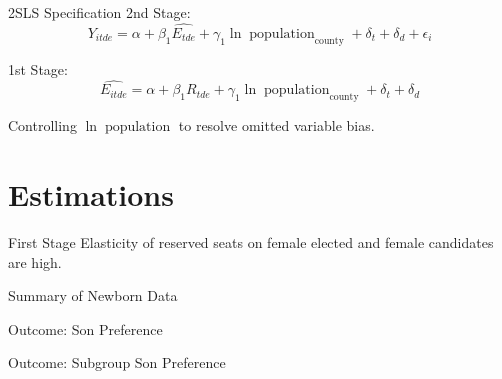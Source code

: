 \documentclass[
  9pt,
  ignorenonframetext,
  aspectratio=43,
]{beamer}
\begin{document}
\begin{frame}{2SLS Specification}
\protect\hypertarget{sls-specification}{}
2nd Stage: \[
Y_{itde} = \alpha + \beta_1 \hat{E_{tde}} + \gamma_1 \ln \operatorname{population}_{\text{county}} + \delta_t + \delta_{d} + \epsilon_i
\]

1st Stage: \[
\hat{E_{itde}} = \alpha + \beta_1 R_{tde}  + \gamma_1 \ln \operatorname{population}_{\text{county}} + \delta_t + \delta_{d}
\]

Controlling \(\ln \operatorname{population}\) to resolve omitted
variable bias.
\end{frame}

\hypertarget{estimations}{%
\section{Estimations}\label{estimations}}

\begin{frame}{First Stage}
\protect\hypertarget{first-stage}{}
Elasticity of reserved seats on female elected and female candidates are
high.


\end{frame}

\begin{frame}{Summary of Newborn Data}
\protect\hypertarget{summary-of-newborn-data}{}

\end{frame}

\begin{frame}{Outcome: Son Preference}
\protect\hypertarget{outcome-son-preference}{}

\end{frame}

\begin{frame}{Outcome: Subgroup Son Preference}
\protect\hypertarget{outcome-subgroup-son-preference}{}

\end{frame}
\end{document}
